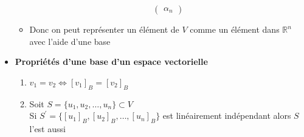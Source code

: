\begin{itemize}
\begin{itemize}[itemsep = 0.5em]
\begin{equation*}
\begin{pmatrix}
                    \alpha_n
                \end{pmatrix}
              \end{equation*}
            \item[] Donc on peut représenter un élément de $V$ comme un élément dans $\mathbb{R}^n$ avec l'aide d'une base
          \end{itemize}
    \item[] \textbf{Propriétés d'une base d'un espace vectorielle} \begin{enumerate}[1)]
        \item $v_1 = v_2 \iff [v_1]_B = [v_2]_B$
        \item Soit $S = \{ u_1, u_2, \ldots, u_n \} \subset V$ \\
        Si $S^\prime = \{ [u_1]_B, [u_2]_B, \ldots, [u_n]_B \}$ est linéairement indépendant alors $S$ l'est aussi 
    \end{enumerate}
\end{itemize}